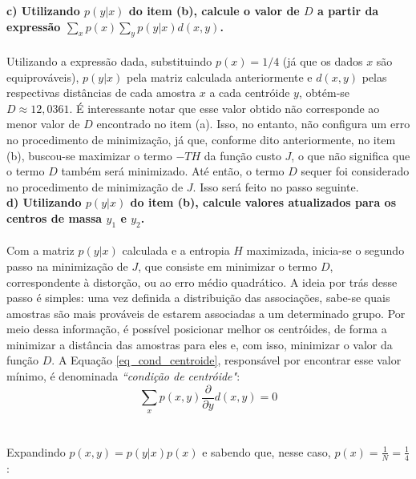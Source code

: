 \documentclass{report}
\begin{document}
\textbf{c) Utilizando $p(y|x)$ do item (b), calcule o valor de $D$ a partir da expressão $\sum_x p(x) \sum_y p(y|x)d(x,y)$.}\\

\paragraph{} Utilizando a expressão dada, substituindo $p(x) = 1/4$ (já que os dados $x$ são equiprováveis), $p(y|x)$ pela matriz calculada anteriormente e $d(x,y)$ pelas respectivas distâncias de cada amostra $x$ a cada centróide $y$, obtém-se $D \approx 12,0361$. É interessante notar que esse valor obtido não corresponde ao menor valor de $D$ encontrado no item (a). Isso, no entanto, não configura um erro no procedimento de minimização, já que, conforme dito anteriormente, no item (b), buscou-se maximizar o termo $-TH$ da função custo $J$, o que não significa que o termo $D$ também será minimizado. Até então, o termo $D$ sequer foi considerado no procedimento de minimização de $J$. Isso será feito no passo seguinte.\\

\textbf{d) Utilizando $p(y|x)$ do item (b), calcule valores atualizados para os centros de massa $y_1$ e $y_2$.}\\

\paragraph{} Com a matriz $p(y|x)$ calculada e a entropia $H$ maximizada, inicia-se o segundo passo na minimização de $J$, que consiste em minimizar o termo $D$, correspondente à distorção, ou ao erro médio quadrático. A ideia por trás desse passo é simples: uma vez definida a distribuição das associações, sabe-se quais amostras são mais prováveis de estarem associadas a um determinado grupo. Por meio dessa informação, é possível posicionar melhor os centróides, de forma a minimizar a distância das amostras para eles e, com isso, minimizar o valor da função $D$. A Equação \eqref{eq_cond_centroide}, responsável por encontrar esse valor mínimo, é denominada \emph{``condição de centróide"}:\\

\begin{equation}
\sum_x p(x,y) \frac{\partial}{\partial y}d(x,y) = 0
\end{equation}\\

\paragraph{} Expandindo $p(x,y) = p(y|x)p(x)$ e sabendo que, nesse caso, $p(x) = \frac{1}{N} = \frac{1}{4}$:\\
\end{document}
